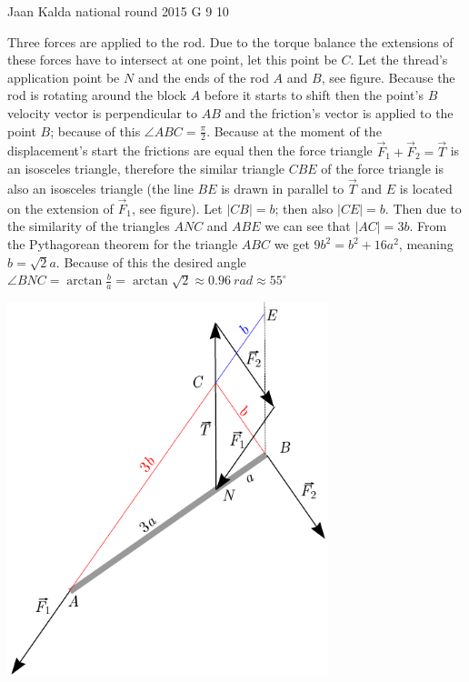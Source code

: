 \documentclass[11pt]{article}
\begin{document}
{Jaan Kalda} %
{national round} %
{2015} %
{G 9} %
{10} %
{

\ifEngSolution
Three forces are applied to the rod. Due to the torque balance the extensions of these forces have to intersect at one point, let this point be $C$. Let the thread’s application point be $N$ and the ends of the rod $A$ and $B$, see figure. Because the rod is rotating around the block $A$ before it starts to shift then the point’s $B$ velocity vector is perpendicular to $AB$ and the friction’s vector is applied to the point $B$; because of this $\angle ABC=\frac{\pi}{2}$. Because at the moment of the displacement’s start the frictions are equal then the force triangle $\vec F_1+\vec F_2=\vec T$ is an isosceles triangle, therefore the similar triangle $CBE$ of the force triangle is also an isosceles triangle (the line $BE$ is drawn in parallel to $\vec T$ and $E$ is located on the extension of $\vec F_1$, see figure). Let $|CB|=b$; then also $|CE|=b$. Then due to the similarity of the triangles $ANC$ and $ABE$ we can see that $|AC|=3b$. From the Pythagorean theorem for the triangle $ABC$ we get $9b^2=b^2+16a^2$, meaning $b=\sqrt 2a$. Because of this the desired angle $\angle BNC=\arctan \frac ba =\arctan \sqrt 2\approx\SI{0.96}{rad}\approx 55^\circ$
\begin{center}
\includegraphics[width=0.7\textwidth]{2015-v3g-09-pulk_lah}
\end{center}
\fi
}
\end{document}
